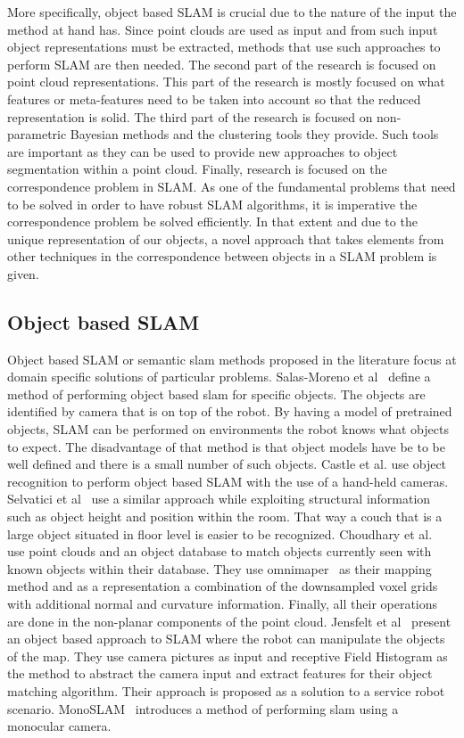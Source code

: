 \documentclass[twoside,hidelinks]{article}
\begin{document}
More specifically, object based SLAM is crucial due to the nature of the input the method at hand has. Since point clouds are used as input and from such input object representations must be extracted, methods that use such approaches to perform SLAM are then needed. The second part of the research is focused on point cloud representations. This part of the research is mostly focused on what features or meta-features need to be taken into account so that the reduced representation is solid. The third part of the research is focused on non-parametric Bayesian methods and the clustering tools they provide. Such tools are important as they can be used to provide new approaches to object segmentation within a point cloud. Finally, research is focused on the correspondence problem in SLAM. As one of the fundamental problems that need to be solved in order to have robust SLAM algorithms, it is imperative the correspondence problem be solved efficiently. In that extent and due to the unique representation of our objects, a novel approach that takes elements from other techniques in the correspondence between objects in a SLAM problem is given.

\subsection{Object based SLAM}
Object based SLAM or semantic slam methods proposed in the literature focus at domain specific solutions of particular problems. Salas-Moreno et al~\cite{slam++} define a method of performing object based slam for specific objects. The objects are identified by camera that is on top of the robot. By having a model of pretrained objects, SLAM can be performed on environments the robot knows what objects to expect. The disadvantage of that method is that object models have be to be well defined and there is a small number of such objects. 
Castle et al. use object recognition to perform object based SLAM with the use of a hand-held cameras. Selvatici et al~\cite{objslam} use a similar approach while exploiting structural information such as object height and position within the room. That way a couch that is a large object situated in floor level is easier to be recognized.
Choudhary et al.~\cite{objectpointslam} use point clouds and an object database to match objects currently seen with known objects within their database. They use omnimaper~\cite{omnimaper} as their mapping method and as a representation a combination of the downsampled  voxel grids with additional normal and curvature information.  Finally, all their operations are done in the non-planar components of the point cloud.
Jensfelt et al~\cite{objslam} present an object based approach to SLAM where the robot can manipulate the objects of the map. They use camera pictures as input and receptive Field Histogram as the method to abstract the camera input and extract features for their object matching algorithm. Their approach is proposed as a solution to a service robot scenario.
MonoSLAM~\cite{monoslam} introduces a method of performing slam using a monocular camera. 
\end{document}
